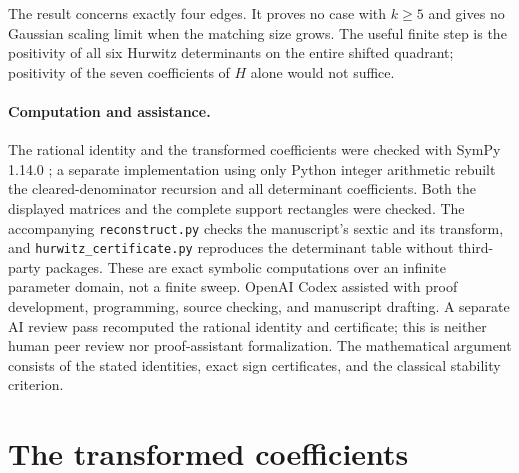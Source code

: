 \documentclass[11pt]{article}
\begin{document}
The result concerns exactly four edges. It proves no case with
$k\ge5$ and gives no Gaussian scaling limit when the matching size
grows. The useful finite step is the positivity of all six Hurwitz
determinants on the entire shifted quadrant; positivity of the
seven coefficients of $H$ alone would not suffice.

\paragraph{Computation and assistance.}
The rational identity and the transformed coefficients were checked
with SymPy 1.14.0 \cite{meurer2017}; a separate implementation using
only Python integer arithmetic rebuilt the cleared-denominator
recursion and all determinant coefficients. Both the displayed
matrices and the complete support rectangles were checked.
The accompanying \texttt{reconstruct.py} checks the manuscript's
sextic and its transform, and \texttt{hurwitz\_certificate.py}
reproduces the determinant table without third-party packages.
These are exact symbolic computations over an infinite parameter
domain, not a finite sweep. OpenAI Codex assisted with proof
development, programming, source checking, and manuscript drafting.
A separate AI review pass recomputed the rational identity and
certificate; this is neither human peer review nor proof-assistant
formalization. The mathematical argument consists of the stated
identities, exact sign certificates, and the classical stability
criterion.

\appendix
\section{The transformed coefficients}\label{app:matrices}
\end{document}

